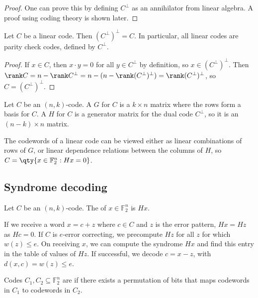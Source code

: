 \begin{proof}
    One can prove this by defining $C^\perp$ as an annihilator from linear algebra.
    A proof using coding theory is shown later.
\end{proof}

\begin{corollary}
    Let $C$ be a linear code.
    Then $(C^\perp)^\perp = C$.
    In particular, all linear codes are parity check codes, defined by $C^\perp$.
\end{corollary}

\begin{proof}
    If $x \in C$, then $x \cdot y = 0$ for all $y \in C^\perp$ by definition, so $x \in (C^\perp)^\perp$.
    Then $\rank C = n - \rank C^\perp = n - (n - \rank (C^\perp)^\perp) = \rank (C^\perp)^\perp$, so $C = (C^\perp)^\perp$.
\end{proof}

\begin{definition}
    Let $C$ be an $(n,k)$-code.
    A  $G$ for $C$ is a $k \times n$ matrix where the rows form a basis for $C$.
    A  $H$ for $C$ is a generator matrix for the dual code $C^\perp$, so it is an $(n-k) \times n$ matrix.
\end{definition}

The codewords of a linear code can be viewed either as linear combinations of rows of $G$, or linear dependence relations between the columns of $H$, so $C = \qty{x \in \mathbb F_2^n : H x = 0}$.

\subsection{Syndrome decoding}
\begin{definition}[Syndrome]
    Let $C$ be an $(n, k)$-code.
    The  of $x \in \mathbb F_2^n$ is $Hx$.
\end{definition}

If we receive a word $x = c + z$ where $c \in C$ and $z$ is the error pattern, $Hx = Hz$ as $Hc = 0$.
If $C$ is $e$-error correcting, we precompute $Hz$ for all $z$ for which $w(z) \leq e$.
On receiving $x$, we can compute the syndrome $Hx$ and find this entry in the table of values of $Hz$.
If successful, we decode $c = x - z$, with $d(x,c) = w(z) \leq e$.

\begin{definition}[Equivalent]
    Codes $C_1, C_2 \subseteq \mathbb F_2^n$ are  if there exists a permutation of bits that maps codewords in $C_1$ to codewords in $C_2$.
\end{definition}

